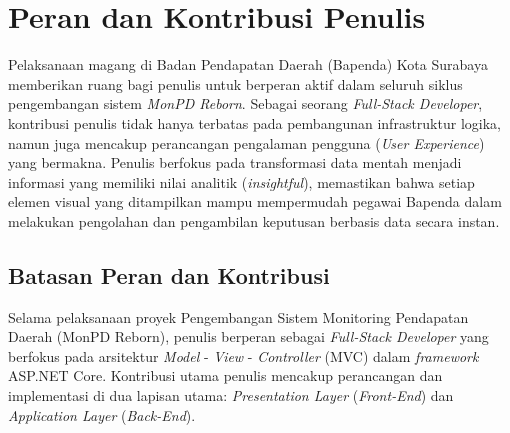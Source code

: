 \section{Peran dan Kontribusi Penulis}
\label{sec:perankontribusi}

Pelaksanaan magang di Badan Pendapatan Daerah (Bapenda) Kota Surabaya memberikan ruang bagi penulis untuk berperan aktif dalam seluruh siklus pengembangan sistem \emph{MonPD Reborn}. Sebagai seorang \emph{Full-Stack Developer}, kontribusi penulis tidak hanya terbatas pada pembangunan infrastruktur logika, namun juga mencakup perancangan pengalaman pengguna (\emph{User Experience}) yang bermakna. Penulis berfokus pada transformasi data mentah menjadi informasi yang memiliki nilai analitik (\emph{insightful}), memastikan bahwa setiap elemen visual yang ditampilkan mampu mempermudah pegawai Bapenda dalam melakukan pengolahan dan pengambilan keputusan berbasis data secara instan.

\subsection{Batasan Peran dan Kontribusi}
Selama pelaksanaan proyek Pengembangan Sistem Monitoring Pendapatan Daerah (MonPD Reborn), penulis berperan sebagai \emph{Full-Stack Developer} yang berfokus pada arsitektur \emph{Model} - \emph{View} - \emph{Controller} (MVC) dalam \emph{framework} ASP.NET Core. Kontribusi utama penulis mencakup perancangan dan implementasi di dua lapisan utama: \emph{Presentation Layer} (\emph{Front-End}) dan \emph{Application Layer} (\emph{Back-End}).

